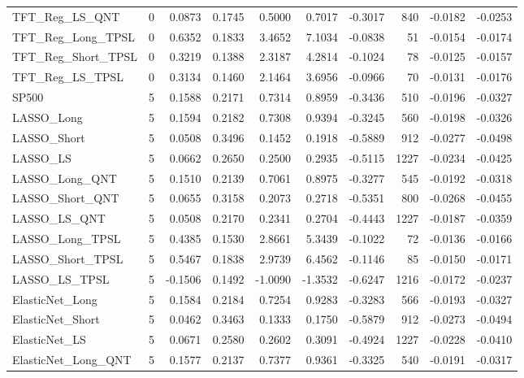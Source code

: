 \begin{tabular}{llrrrrrrrr}
\cline{1-10}
TFT\_Reg\_LS\_QNT & 0 & 0.0873 & 0.1745 & 0.5000 & 0.7017 & -0.3017 & 840 & -0.0182 & -0.0253 \\
\cline{1-10}
TFT\_Reg\_Long\_TPSL & 0 & 0.6352 & 0.1833 & 3.4652 & 7.1034 & -0.0838 & 51 & -0.0154 & -0.0174 \\
\cline{1-10}
TFT\_Reg\_Short\_TPSL & 0 & 0.3219 & 0.1388 & 2.3187 & 4.2814 & -0.1024 & 78 & -0.0125 & -0.0157 \\
\cline{1-10}
TFT\_Reg\_LS\_TPSL & 0 & 0.3134 & 0.1460 & 2.1464 & 3.6956 & -0.0966 & 70 & -0.0131 & -0.0176 \\
\cline{1-10}
SP500 & 5 & 0.1588 & 0.2171 & 0.7314 & 0.8959 & -0.3436 & 510 & -0.0196 & -0.0327 \\
\cline{1-10}
LASSO\_Long & 5 & 0.1594 & 0.2182 & 0.7308 & 0.9394 & -0.3245 & 560 & -0.0198 & -0.0326 \\
\cline{1-10}
LASSO\_Short & 5 & 0.0508 & 0.3496 & 0.1452 & 0.1918 & -0.5889 & 912 & -0.0277 & -0.0498 \\
\cline{1-10}
LASSO\_LS & 5 & 0.0662 & 0.2650 & 0.2500 & 0.2935 & -0.5115 & 1227 & -0.0234 & -0.0425 \\
\cline{1-10}
LASSO\_Long\_QNT & 5 & 0.1510 & 0.2139 & 0.7061 & 0.8975 & -0.3277 & 545 & -0.0192 & -0.0318 \\
\cline{1-10}
LASSO\_Short\_QNT & 5 & 0.0655 & 0.3158 & 0.2073 & 0.2718 & -0.5351 & 800 & -0.0268 & -0.0455 \\
\cline{1-10}
LASSO\_LS\_QNT & 5 & 0.0508 & 0.2170 & 0.2341 & 0.2704 & -0.4443 & 1227 & -0.0187 & -0.0359 \\
\cline{1-10}
LASSO\_Long\_TPSL & 5 & 0.4385 & 0.1530 & 2.8661 & 5.3439 & -0.1022 & 72 & -0.0136 & -0.0166 \\
\cline{1-10}
LASSO\_Short\_TPSL & 5 & 0.5467 & 0.1838 & 2.9739 & 6.4562 & -0.1146 & 85 & -0.0150 & -0.0171 \\
\cline{1-10}
LASSO\_LS\_TPSL & 5 & -0.1506 & 0.1492 & -1.0090 & -1.3532 & -0.6247 & 1216 & -0.0172 & -0.0237 \\
\cline{1-10}
ElasticNet\_Long & 5 & 0.1584 & 0.2184 & 0.7254 & 0.9283 & -0.3283 & 566 & -0.0193 & -0.0327 \\
\cline{1-10}
ElasticNet\_Short & 5 & 0.0462 & 0.3463 & 0.1333 & 0.1750 & -0.5879 & 912 & -0.0273 & -0.0494 \\
\cline{1-10}
ElasticNet\_LS & 5 & 0.0671 & 0.2580 & 0.2602 & 0.3091 & -0.4924 & 1227 & -0.0228 & -0.0410 \\
\cline{1-10}
ElasticNet\_Long\_QNT & 5 & 0.1577 & 0.2137 & 0.7377 & 0.9361 & -0.3325 & 540 & -0.0191 & -0.0317 \\

\end{tabular}
